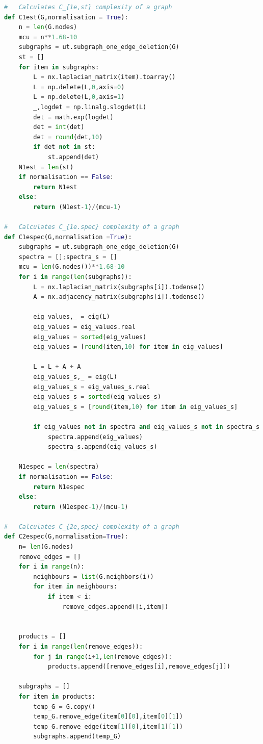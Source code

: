 \documentclass[12pt]{article}
\begin{document}
{\begin{lstlisting}[language=Python,breaklines=true]
#   Calculates C_{1e,st} complexity of a graph
def C1est(G,normalisation = True):
    n = len(G.nodes)
    mcu = n**1.68-10
    subgraphs = ut.subgraph_one_edge_deletion(G)
    st = []
    for item in subgraphs:
        L = nx.laplacian_matrix(item).toarray()
        L = np.delete(L,0,axis=0)
        L = np.delete(L,0,axis=1)
        _,logdet = np.linalg.slogdet(L)
        det = math.exp(logdet)
        det = int(det)
        det = round(det,10)
        if det not in st:
            st.append(det)
    N1est = len(st)
    if normalisation == False:
        return N1est
    else:
        return (N1est-1)/(mcu-1)

#   Calculates C_{1e.spec} complexity of a graph
def C1espec(G,normalisation =True):
    subgraphs = ut.subgraph_one_edge_deletion(G)
    spectra = [];spectra_s = []
    mcu = len(G.nodes())**1.68-10
    for i in range(len(subgraphs)):
        L = nx.laplacian_matrix(subgraphs[i]).todense()
        A = nx.adjacency_matrix(subgraphs[i]).todense()
        
        eig_values,_ = eig(L)
        eig_values = eig_values.real
        eig_values = sorted(eig_values)
        eig_values = [round(item,10) for item in eig_values]
        
        L = L + A + A
        eig_values_s,_ = eig(L)
        eig_values_s = eig_values_s.real
        eig_values_s = sorted(eig_values_s)
        eig_values_s = [round(item,10) for item in eig_values_s]
        
        if eig_values not in spectra and eig_values_s not in spectra_s:
            spectra.append(eig_values)
            spectra_s.append(eig_values_s)
        
    N1espec = len(spectra)
    if normalisation == False:
        return N1espec
    else:
        return (N1espec-1)/(mcu-1)

#   Calculates C_{2e,spec} complexity of a graph
def C2espec(G,normalisation=True):
    n= len(G.nodes)
    remove_edges = []
    for i in range(n):
        neighbours = list(G.neighbors(i))
        for item in neighbours:
            if item < i:
                remove_edges.append([i,item])
    
    
    products = []
    for i in range(len(remove_edges)):
        for j in range(i+1,len(remove_edges)):
            products.append([remove_edges[i],remove_edges[j]])
    
    subgraphs = []
    for item in products:
        temp_G = G.copy()
        temp_G.remove_edge(item[0][0],item[0][1])
        temp_G.remove_edge(item[1][0],item[1][1])
        subgraphs.append(temp_G)
        

\end{lstlisting}}
\end{document}
